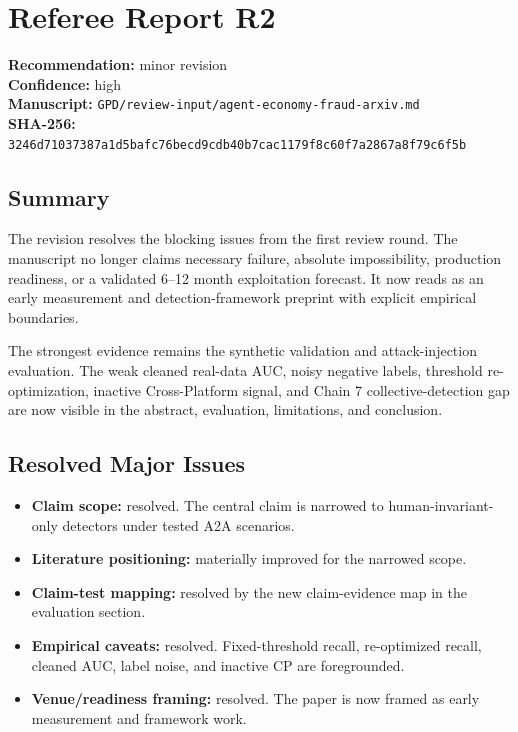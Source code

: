 \section*{Referee Report R2}

\textbf{Recommendation:} minor revision\\
\textbf{Confidence:} high\\
\textbf{Manuscript:} \texttt{GPD/review-input/agent-economy-fraud-arxiv.md}\\
\textbf{SHA-256:} \texttt{3246d71037387a1d5bafc76becd9cdb40b7cac1179f8c60f7a2867a8f79c6f5b}

\subsection*{Summary}

The revision resolves the blocking issues from the first review round. The manuscript no longer claims necessary failure, absolute impossibility, production readiness, or a validated 6--12 month exploitation forecast. It now reads as an early measurement and detection-framework preprint with explicit empirical boundaries.

The strongest evidence remains the synthetic validation and attack-injection evaluation. The weak cleaned real-data AUC, noisy negative labels, threshold re-optimization, inactive Cross-Platform signal, and Chain 7 collective-detection gap are now visible in the abstract, evaluation, limitations, and conclusion.

\subsection*{Resolved Major Issues}

\begin{itemize}
\item \textbf{Claim scope:} resolved. The central claim is narrowed to human-invariant-only detectors under tested A2A scenarios.
\item \textbf{Literature positioning:} materially improved for the narrowed scope.
\item \textbf{Claim-test mapping:} resolved by the new claim-evidence map in the evaluation section.
\item \textbf{Empirical caveats:} resolved. Fixed-threshold recall, re-optimized recall, cleaned AUC, label noise, and inactive CP are foregrounded.
\item \textbf{Venue/readiness framing:} resolved. The paper is now framed as early measurement and framework work.
\end{itemize}

